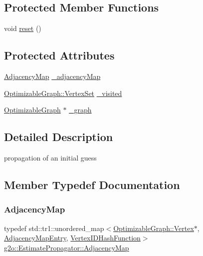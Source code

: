 \subsection*{Protected Member Functions}
\begin{DoxyCompactItemize}
\item 
void \mbox{\hyperlink{classg2o_1_1_estimate_propagator_a8319099eda0552b9ef62a0bb40bb0785}{reset}} ()
\end{DoxyCompactItemize}
\subsection*{Protected Attributes}
\begin{DoxyCompactItemize}
\item 
\mbox{\hyperlink{classg2o_1_1_estimate_propagator_aa450038ec206c089ecf023cb88cb2847}{Adjacency\+Map}} \mbox{\hyperlink{classg2o_1_1_estimate_propagator_ac3f6429938db62696444fd7ee765439a}{\+\_\+adjacency\+Map}}
\item 
\mbox{\hyperlink{classg2o_1_1_hyper_graph_a703938cdb4bb636860eed55a2489d70c}{Optimizable\+Graph\+::\+Vertex\+Set}} \mbox{\hyperlink{classg2o_1_1_estimate_propagator_a1256927d6d1832ee300daa53d1c845a2}{\+\_\+visited}}
\item 
\mbox{\hyperlink{structg2o_1_1_optimizable_graph}{Optimizable\+Graph}} $\ast$ \mbox{\hyperlink{classg2o_1_1_estimate_propagator_ac2dcd3169696692ce3f0679235933e8a}{\+\_\+graph}}
\end{DoxyCompactItemize}


\subsection{Detailed Description}
propagation of an initial guess 

\subsection{Member Typedef Documentation}
\mbox{\label{classg2o_1_1_estimate_propagator_aa450038ec206c089ecf023cb88cb2847}} 
\subsubsection{\texorpdfstring{Adjacency\+Map}{AdjacencyMap}}
{\footnotesize\ttfamily typedef std\+::tr1\+::unordered\+\_\+map$<$\mbox{\hyperlink{classg2o_1_1_optimizable_graph_1_1_vertex}{Optimizable\+Graph\+::\+Vertex}}$\ast$, \mbox{\hyperlink{classg2o_1_1_estimate_propagator_1_1_adjacency_map_entry}{Adjacency\+Map\+Entry}}, \mbox{\hyperlink{classg2o_1_1_estimate_propagator_1_1_vertex_i_d_hash_function}{Vertex\+I\+D\+Hash\+Function}}$>$ \mbox{\hyperlink{classg2o_1_1_estimate_propagator_aa450038ec206c089ecf023cb88cb2847}{g2o\+::\+Estimate\+Propagator\+::\+Adjacency\+Map}}}

